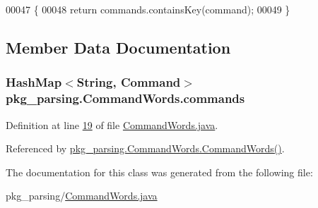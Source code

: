 \begin{DoxyCode}
00047                                              \{
00048         \textcolor{keywordflow}{return} commands.containsKey(command);
00049     \}
\end{DoxyCode}


\subsection{Member Data Documentation}
\hypertarget{classpkg__parsing_1_1CommandWords_a82467831861a15539131a50c22e826fc}{
\subsubsection[{commands}]{\setlength{\rightskip}{0pt plus 5cm}Hash\-Map$<$String, {\bf Command}$>$ pkg\-\_\-parsing.\-Command\-Words.\-commands\hspace{0.3cm}{\ttfamily [private]}}}\label{classpkg__parsing_1_1CommandWords_a82467831861a15539131a50c22e826fc}


Definition at line \hyperlink{CommandWords_8java_source_l00019}{19} of file \hyperlink{CommandWords_8java_source}{Command\-Words.\-java}.



Referenced by \hyperlink{CommandWords_8java_source_l00024}{pkg\-\_\-parsing.\-Command\-Words.\-Command\-Words()}.



The documentation for this class was generated from the following file\-:\begin{DoxyCompactItemize}
\item 
pkg\-\_\-parsing/\hyperlink{CommandWords_8java}{Command\-Words.\-java}\end{DoxyCompactItemize}
